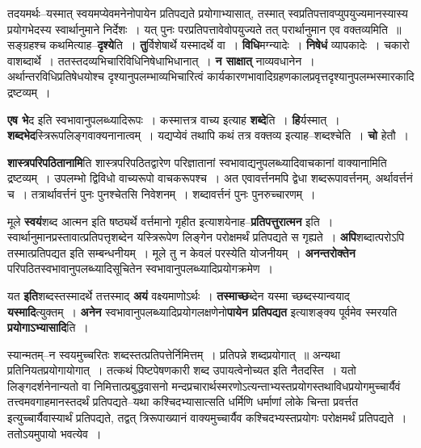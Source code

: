 \documentclass[article,12pt,a4paper]{memoir}
\begin{document}
	तदयमर्थः--यस्मात् स्वयमप्येवमनेनोपायेन प्रतिपद्यते प्रयोगाभ्यासात्, तस्मात् स्वप्रतिपत्तावप्युपयुज्यमानस्यास्य प्रयोगभेदस्य स्वार्थानुमाने निर्देशः । यत् पुनः परप्रतिपत्तावेवोपयुज्यते तत् परार्थानुमान एव वक्तव्यमिति ॥ सङ्ग्रहश्च कथमित्याह--\textbf{दृश्ये}ति । \textbf{तु}र्विशेषार्थे यस्मादर्थे वा । \textbf{विधि}मग्न्यादेः । \textbf{निषेधं} व्यापकादेः । चकारो वाशब्दार्थे । ततस्तदव्यभिचारिविधिनिषेधाभिधानात् । \textbf{न साक्षात्} नाव्यवधानेन । अर्थान्तरविधिप्रतिषेधयोश्च दृश्यानुपलम्भाव्यभिचारित्वं कार्यकारणभावादिग्रहणकालप्रवृत्तदृश्यानुपलम्भस्मारकादि द्रष्टव्यम् ।
	\pend
      

	  \pstart \textbf{एष भे}\leavevmode{}द इति स्वभावानुपलब्ध्यादिरूपः । कस्मात्तत्र वाच्य इत्याह \textbf{शब्दे}ति । \textbf{हि}र्यस्मात् । \textbf{शब्दभेद}स्त्रिरूपलिङ्गवाक्यनानात्वम् । यद्यप्येवं तथापि कथं तत्र वक्तव्य इत्याह--शब्दश्चेति । \textbf{चो} हेतौ ।
	\pend
      

	  \pstart \textbf{शास्त्रपरिपठितानामि}ति शास्त्रपरिपठितद्वारेण परिज्ञातानां स्वभावाद्यनुपलब्ध्यादिवाचकानां वाक्यानामिति द्रष्टव्यम् । उपलम्भो द्विविधो वाच्यरूपो वाचकरूपश्च । अत एवावर्त्तनमपि द्वेधा शब्दरूपावर्त्तनम्, अर्थावर्त्तनं च । तत्रार्थावर्त्तनं पुनः पुनश्चेतसि निवेशनम् । शब्दावर्त्तनं पुनः पुनरुच्चारणम् ।
	\pend
      

	  \pstart मूले \textbf{स्वयं}शब्द आत्मन इति षष्ठ्यर्थे वर्त्तमानो गृहीत इत्याशयेनाह--\textbf{प्रतिपत्तुरात्मन} इति । स्वार्थानुमानप्रस्तावात्प्रतिपत्तृशब्देन यस्त्रिरूपेण लिङ्गेन परोक्षमर्थं प्रतिपद्यते स गृह्यते । \textbf{अपि}शब्दात्परोऽपि तस्मात्प्रतिपद्यत इति सम्बन्धनीयम् । मूले तु न केवलं परस्येति योजनीयम् । \textbf{अनन्तरोक्तेन} परिपठितस्वभावानुपलब्ध्यादिसूचितेन स्वभावानुपलब्ध्यादिप्रयोगक्रमेण ।
	\pend
      

	  \pstart यत \textbf{इति}शब्दस्तस्मादर्थे तत्तस्माद् \textbf{अयं} वक्ष्यमाणोऽर्थः । \textbf{तस्माच्छ}ब्देन यस्मा च्छब्दस्यान्वयाद् \textbf{यस्मादि}त्युक्तम् । \textbf{अनेन} स्वभावानुपलब्ध्यादिप्रयोगलक्षणेनो\textbf{पायेन प्रतिपद्यत} इत्याशङ्क्य पूर्वमेव स्मरयति \textbf{प्रयोगाऽभ्यासादि}ति ।
	\pend
      

	  \pstart स्यान्मतम्--न स्वयमुच्चरितः शब्दस्तत्प्रतिपत्तेर्निमित्तम् । प्रतिपन्ने शब्दप्रयोगात् ॥ अन्यथा प्रतिनियतप्रयोगायोगात् । तत्कथं पिष्टपेषणकारी शब्द उपायत्वेनोच्यत इति नैतदस्ति । यतो लिङ्गदर्शनेनान्यतो वा निमित्तात्प्रबुद्धवासनो मन्दप्रचारार्थस्मरणोऽत्यन्ताभ्यस्तप्रयोगस्तथाविधप्रयोगमुच्चार्यैवं तत्त्वमवगाहमानस्तदर्थं प्रतिपद्यते--यथा कश्चिदभ्यासात्सति धर्मिणि धर्माणां लोके चिन्ता प्रवर्त्तत इत्युच्चार्यैवास्यार्थं प्रतिपद्यते, तद्वत् त्रिरूपाख्यानं वाक्यमुच्चार्यैव कश्चिदभ्यस्तप्रयोगः परोक्षमर्थं प्रतिपद्यते । ततोऽयमुपायो भवत्येव ।
	\pend
      
\end{document}
